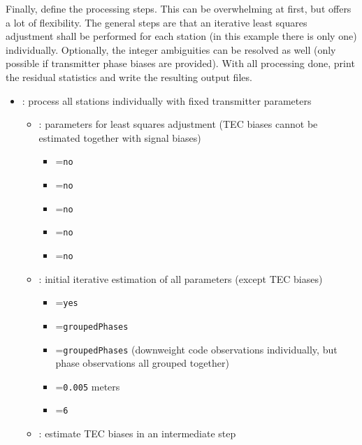Finally, define the processing steps. This can be overwhelming at first, but offers a lot of flexibility.
The general steps are that an iterative least squares adjustment shall be performed for each station
(in this example there is only one) individually. Optionally, the integer ambiguities can be resolved as well
(only possible if transmitter phase biases are provided).
With all processing done, print the residual statistics and write the resulting output files.
\begin{itemize}
  \item {}:
        process all stations individually with fixed transmitter parameters
  \begin{itemize}
    \item {}: parameters
          for least squares adjustment (TEC biases cannot be estimated together with signal biases)
    \begin{itemize}
      \item {}=\verb|no|
      \item {}=\verb|no|
      \item {}=\verb|no|
      \item {}=\verb|no|
      \item {}=\verb|no|
    \end{itemize}
    \item {}: initial iterative estimation
          of all parameters (except TEC biases)
    \begin{itemize}
      \item {}=\verb|yes|
      \item {}=\verb|groupedPhases|
      \item {}=\verb|groupedPhases| (downweight code observations individually,
            but phase observations all grouped together)
      \item {}=\verb|0.005| meters
      \item {}=\verb|6|
    \end{itemize}
    \item {}: estimate TEC biases in an intermediate step

\end{itemize}
\end{itemize}
